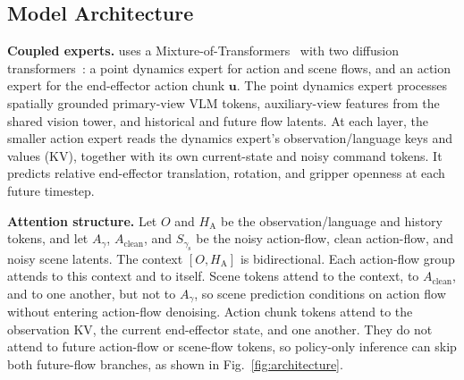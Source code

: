 \vspace{-0.2cm}

\subsection{Model Architecture}
\label{sec:method:architecture}
\vspace{-0.2cm}


\noindent\textbf{Coupled experts.}
\method{} uses a Mixture-of-Transformers~\citep{liang2024mixture}
with two diffusion transformers~\citep{peebles2023scalable}:
a point dynamics expert for action and scene flows, and an action expert for the
end-effector action chunk $\mathbf u$. The point dynamics expert processes spatially grounded
primary-view VLM tokens, auxiliary-view features from the shared vision
tower, and historical and future flow latents. At each layer, the smaller
action expert reads the dynamics expert's observation/language keys and
values (KV), together with its own current-state and noisy command tokens.
It predicts relative end-effector translation, rotation, and gripper
openness at each future timestep.

\noindent\textbf{Attention structure.}
Let $O$ and $H_{\mathrm A}$ be the observation/language and history
tokens, and let $A_\gamma$, $A_{\mathrm{clean}}$, and $S_{\gamma_{\mathrm s}}$
be the noisy action-flow, clean action-flow, and noisy scene latents.
The context $[O,H_{\mathrm A}]$ is bidirectional.
Each action-flow group attends to this context and to itself.
Scene tokens attend to the context, to $A_{\mathrm{clean}}$, and to one
another, but not to $A_\gamma$, so scene prediction conditions on action
flow without entering action-flow denoising.
Action chunk tokens attend to the observation KV, the current end-effector
state, and one another.
They do not attend to future action-flow or scene-flow tokens, so
policy-only inference can skip both future-flow branches, as shown in
Fig.~\ref{fig:architecture}.

